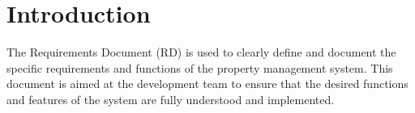 \section{Introduction}

The Requirements Document (RD) is used to clearly define and document the specific requirements and functions of the property management system. This document is aimed at the development team to ensure that the desired functions and features of the system are fully understood and implemented.
